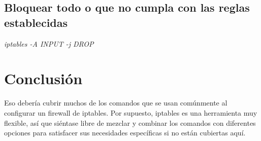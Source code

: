 \documentclass{article}
\begin{document}
\subsection*{Bloquear todo o que no cumpla con las reglas establecidas}
\begin{center}
	\textit{iptables -A INPUT -j DROP}
\end{center}
\section*{Conclusión}
Eso debería cubrir muchos de los comandos que se usan comúnmente al configurar un firewall de iptables. Por supuesto, iptables es una herramienta muy flexible, así que siéntase libre de mezclar y combinar los comandos con diferentes opciones para satisfacer sus necesidades específicas si no están cubiertas aquí.
\end{document}
